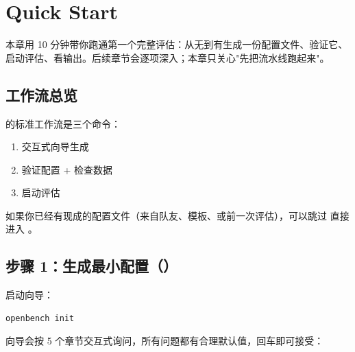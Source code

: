 
\chapter{Quick Start}

本章用 10 分钟带你跑通第一个完整评估：从无到有生成一份配置文件、验证它、启动评估、看输出。后续章节会逐项深入；本章只关心"先把流水线跑起来"。

\section{工作流总览}

\openbench{} 的标准工作流是三个命令：

\begin{enumerate}
  \item {}\quad 交互式向导生成 
  \item {}\quad 验证配置 + 检查数据
  \item {}\quad 启动评估
\end{enumerate}

\begin{tipBox}
如果你已经有现成的配置文件（来自队友、模板、或前一次评估），可以跳过  直接进入 。
\end{tipBox}

\section{步骤 1：生成最小配置（）}

启动向导：

\begin{verbatim}
openbench init
\end{verbatim}

向导会按 5 个章节交互式询问，所有问题都有合理默认值，回车即可接受：

